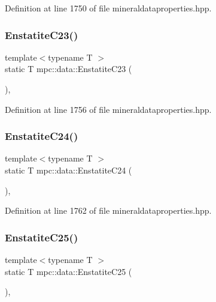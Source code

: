 Definition at line 1750 of file mineraldataproperties.\+hpp.

\mbox{\label{namespacempc_1_1data_af79140114d2f2b096bbac29b877163d5}} 
\subsubsection{\texorpdfstring{Enstatite\+C23()}{EnstatiteC23()}}
{\footnotesize\ttfamily template$<$typename T $>$ \\
static T mpc\+::data\+::\+Enstatite\+C23 (\begin{DoxyParamCaption}{ }\end{DoxyParamCaption})\hspace{0.3cm}{\ttfamily [inline]}, {\ttfamily [static]}}



Definition at line 1756 of file mineraldataproperties.\+hpp.

\mbox{\label{namespacempc_1_1data_a03ec54e4369e490988c920f534dd2db2}} 
\subsubsection{\texorpdfstring{Enstatite\+C24()}{EnstatiteC24()}}
{\footnotesize\ttfamily template$<$typename T $>$ \\
static T mpc\+::data\+::\+Enstatite\+C24 (\begin{DoxyParamCaption}{ }\end{DoxyParamCaption})\hspace{0.3cm}{\ttfamily [inline]}, {\ttfamily [static]}}



Definition at line 1762 of file mineraldataproperties.\+hpp.

\mbox{\label{namespacempc_1_1data_a9167f3400021ae09ff00867dc979107f}} 
\subsubsection{\texorpdfstring{Enstatite\+C25()}{EnstatiteC25()}}
{\footnotesize\ttfamily template$<$typename T $>$ \\
static T mpc\+::data\+::\+Enstatite\+C25 (\begin{DoxyParamCaption}{ }\end{DoxyParamCaption})\hspace{0.3cm}{\ttfamily [inline]}, {\ttfamily [static]}}



